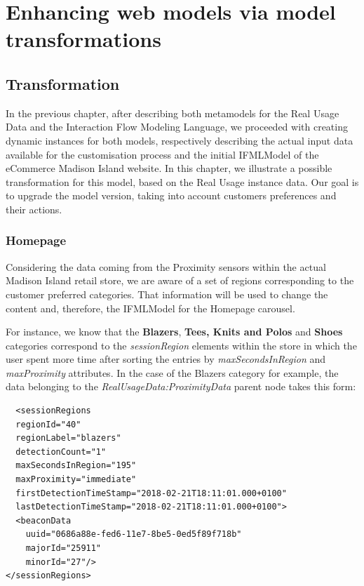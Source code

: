 \chead{}

\chapter{Enhancing web models via model transformations}
\label{enhancing-web-models-via-model-transformations}

\section{Transformation}

In the previous chapter, after describing both metamodels for the Real Usage Data and the Interaction Flow Modeling Language, we proceeded with creating dynamic instances for both models, respectively describing the actual input data available for the customisation process and the initial IFMLModel of the eCommerce Madison Island website. In this chapter, we illustrate a possible transformation for this model, based on the Real Usage instance data. Our goal is to upgrade the model version, taking into account customers preferences and their actions.

\subsection{Homepage}
\label{homepage-updates}
Considering the data coming from the Proximity sensors within the actual Madison Island retail store, we are aware of a set of regions corresponding to the customer preferred categories. That information will be used to change the content and, therefore, the IFMLModel for the Homepage carousel.

For instance, we know that the \textbf{Blazers}, \textbf{Tees, Knits and Polos} and \textbf{Shoes} categories correspond to the \textit{sessionRegion} elements within the store in which the user spent more time after sorting the entries by \textit{maxSecondsInRegion} and \textit{maxProximity} attributes. In the case of the Blazers category for example, the data belonging to the \textit{RealUsageData:ProximityData} parent node takes this form:

\vspace{0.5cm}
\lstset{language=XML}
\begin{lstlisting} 
  <sessionRegions
  regionId="40"
  regionLabel="blazers"
  detectionCount="1"
  maxSecondsInRegion="195"
  maxProximity="immediate"
  firstDetectionTimeStamp="2018-02-21T18:11:01.000+0100"
  lastDetectionTimeStamp="2018-02-21T18:11:01.000+0100">
  <beaconData
    uuid="0686a88e-fed6-11e7-8be5-0ed5f89f718b"
    majorId="25911"
    minorId="27"/>
</sessionRegions>
\end{lstlisting}
\vspace{0.5cm}


